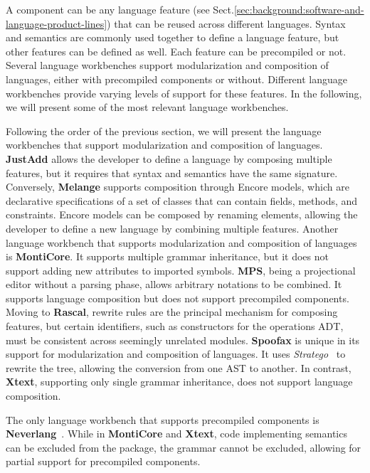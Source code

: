 A component can be any language feature (see Sect.\ref{sec:background:software-and-language-product-lines}) that can be reused across different languages. Syntax and semantics are commonly used together to define a language feature, but other features can be defined as well. Each feature can be precompiled\cite{Cazzola13e} or not. Several language workbenches support modularization and composition of languages, either with precompiled components or without. Different language workbenches provide varying levels of support for these features. In the following, we will present some of the most relevant language workbenches.

Following the order of the previous section, we will present the language workbenches that support modularization and composition of languages. \textbf{JustAdd} allows the developer to define a language by composing multiple features, but it requires that syntax and semantics have the same signature. Conversely, \textbf{Melange} supports composition through Encore models, which are declarative specifications of a set of classes that can contain fields, methods, and constraints. Encore models can be composed by renaming elements, allowing the developer to define a new language by combining multiple features. Another language workbench that supports modularization and composition of languages is \textbf{MontiCore}. It supports multiple grammar inheritance, but it does not support adding new attributes to imported symbols. \textbf{MPS}, being a projectional editor without a parsing phase, allows arbitrary notations to be combined. It supports language composition but does not support precompiled components. Moving to \textbf{Rascal}, rewrite rules are the principal mechanism for composing features, but certain identifiers, such as constructors for the operations ADT, must be consistent across seemingly unrelated modules. \textbf{Spoofax} is unique in its support for modularization and composition of languages. It uses \textit{Stratego}~\cite{Bravenboer08} to rewrite the tree, allowing the conversion from one AST to another. In contrast, \textbf{Xtext}, supporting only single grammar inheritance, does not support language composition.

The only language workbench that supports precompiled components is \textbf{Neverlang}~\cite{Cazzola13e}. While in \textbf{MontiCore} and \textbf{Xtext}, code implementing semantics can be excluded from the package, the grammar cannot be excluded, allowing for partial support for precompiled components.

